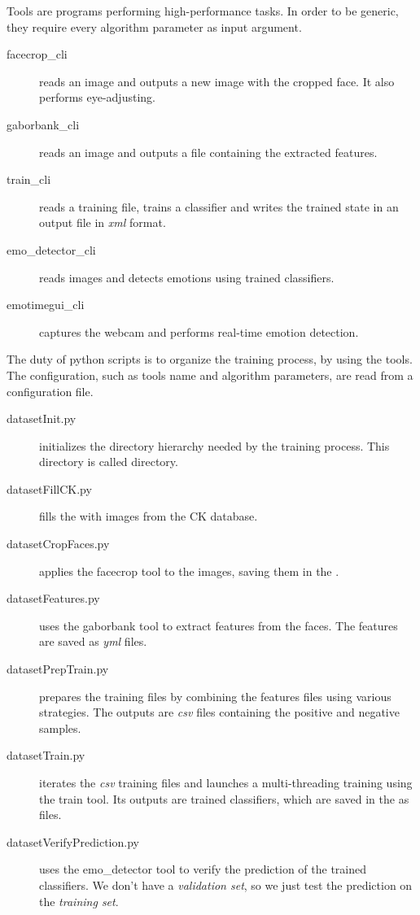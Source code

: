 Tools are  programs performing high-performance tasks. In order
to be generic, they require every algorithm parameter as input argument.

\begin{description}
  \item[facecrop\_cli] reads an image and outputs a new image with the cropped
    face. It also performs eye-adjusting.
  \item[gaborbank\_cli] reads an image and outputs a file containing the
    extracted features.
  \item[train\_cli] reads a training file, trains a classifier and writes the
    trained state in an output file in \emph{xml} format.
  \item[emo\_detector\_cli] reads images and detects emotions using trained
    classifiers.
  \item[emotimegui\_cli] captures the webcam and performs real-time emotion
    detection.
\end{description}

The duty of python scripts is to organize the training process, by using the
 tools. The configuration, such as tools name and algorithm
parameters, are read from a configuration file.

\begin{description}
  \item[datasetInit.py] initializes the directory hierarchy needed by the
    training process. This directory is called  directory.
  \item[datasetFillCK.py] fills the  with images from the CK database.
  \item[datasetCropFaces.py] applies the facecrop tool to the images, saving
    them in the .
  \item[datasetFeatures.py] uses the gaborbank tool to extract features from
    the faces. The features are saved as \emph{yml} files.
  \item[datasetPrepTrain.py] prepares the training files by combining the
    features files using various strategies. The outputs are \emph{csv} files
    containing the positive and negative samples.
  \item[datasetTrain.py] iterates the \emph{csv} training files and launches a
    multi-threading training using the train tool. Its outputs are trained
    classifiers, which are saved in the  as  files.
  \item[datasetVerifyPrediction.py] uses the emo\_detector tool to verify the
    prediction of the trained classifiers. We don't have a \emph{validation
    set}, so we just test the prediction on the \emph{training set}.
\end{description}
